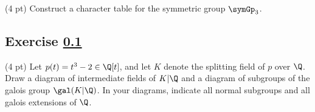 
(4 pt) Construct a character table for the symmetric group $\symGp_{3}$.

\spaceSolution{2in}{%
}%



\subsection{Exercise \ref{sec : me00tcQ3}}
\label{sec : me00tcQ3}


(4 pt) Let $p(t) = t^{3} - 2 \in \Q[t]$, and let $K$ denote the splitting field of $p$ over $\Q$. Draw a diagram of intermediate fields of $K | \Q$ and a diagram of subgroups of the galois group $\gal(K | \Q)$. In your diagrams, indicate all normal subgroups and all galois extensions of $\Q$.

\spaceSolution{2in}{%
}%
